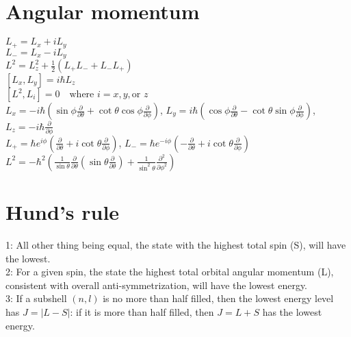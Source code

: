 \documentclass[12pt,a4paper]{article}
\begin{document}
\section*{Angular momentum}
\begin{center}
	$L_+ = L_x + iL_y$\\[.15in]
	$L_- = L_x - iL_y$\\[.15in]
	$L^2 = L_z^2 + \frac{1}{2}(L_+L_- + L_-L_+)$\\[.15in]
	$[L_x, L_y] = i\hbar L_z$\\[.15in]
	$[L^2, L_i] = 0 \quad \text{where } i = x, y, \text{or } z$\\[.15in]
	$L_x = -i\hbar \left( \sin\phi \frac{\partial}{\partial \theta} + \cot\theta \cos\phi \frac{\partial}{\partial \phi} \right)$,
	$L_y = i\hbar \left( \cos\phi \frac{\partial}{\partial \theta} - \cot\theta \sin\phi \frac{\partial}{\partial \phi} \right)$,
	$L_z = -i\hbar \frac{\partial}{\partial \phi}$\\[.15in]
	$L_+ = \hbar e^{i\phi} \left( \frac{\partial}{\partial \theta} + i\cot\theta \frac{\partial}{\partial \phi} \right)$,
	$L_- = \hbar e^{-i\phi} \left( -\frac{\partial}{\partial \theta} + i\cot\theta \frac{\partial}{\partial \phi} \right)$\\[.15in]
	$L^2 = -\hbar^2 \left( \frac{1}{\sin\theta} \frac{\partial}{\partial \theta} \left( \sin\theta \frac{\partial}{\partial \theta} \right) + \frac{1}{\sin^2\theta} \frac{\partial^2}{\partial \phi^2} \right)$\\[.15in]
\end{center}

\section*{Hund's rule}
1: All other thing being equal, the state with the highest total spin (S), will have the lowest.\\
2: For a given spin, the state the highest total orbital angular momentum (L), consistent with overall anti-symmetrization, will have the lowest energy.\\
3: If a subshell $(n, l)$ is no more than half filled, then the lowest energy level has $J= |L-S|$: if it is more than half filled, then $J= L+S$ has the lowest energy.\\
\end{document}
